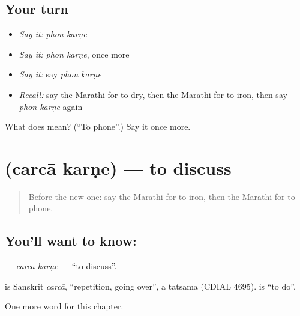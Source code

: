 \subsection*{Your turn}
\begin{itemize}
\raggedright
  \item \emph{Say it:} \emph{phon karṇe}
  \item \emph{Say it:} \emph{phon karṇe}, once more
  \item \emph{Say it:} say \emph{phon karṇe}
  \item \emph{Recall:} say the Marathi for to dry, then the Marathi for to iron, then say \emph{phon karṇe} again
\end{itemize}

\begin{tcolorbox}[breakable,colback=teal!4,colframe=teal!35!black,title={Before you move on}]
What does   mean? (\textquotedblleft{}To phone\textquotedblright{}.) Say it once more.
\end{tcolorbox}
\section[\texorpdfstring{\mr{चर्चा} \mr{करणे} (carcā karṇe)}{चर्चा करणे (carcā karṇe)}]{  (carcā karṇe) — to discuss}

\label{lesson:MR-C194-carca-karne}



\begin{quote}
Before the new one: say the Marathi for to iron, then the Marathi for to phone.
\end{quote}

\subsection*{You'll want to know:  }
\textbf{ } — \emph{carcā karṇe} — \textquotedblleft{}to discuss\textquotedblright{}.

\begin{cousinweb}
\textbf{} is Sanskrit \emph{carcā}, \textquotedblleft{}repetition, going over\textquotedblright{}, a tatsama (CDIAL 4695). \textbf{} is \textquotedblleft{}to do\textquotedblright{}.
\end{cousinweb}

\begin{grammarlens}[title={What you've built}]
One more word for this chapter.
\end{grammarlens}

